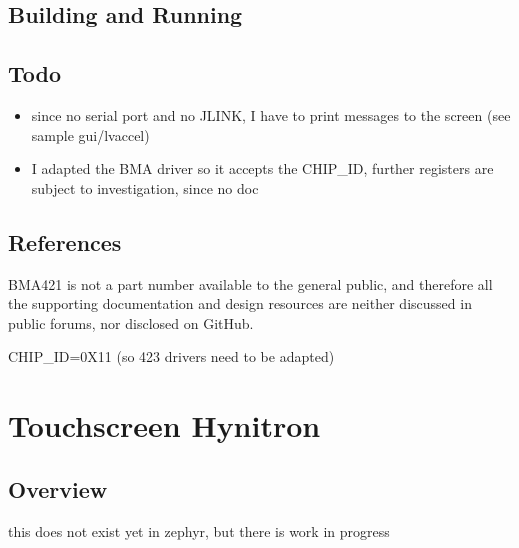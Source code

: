 \documentclass[letterpaper,10pt,english]{sphinxmanual}
\begin{document}
\subsection{Building and Running}
\label{\detokenize{behind/bma280:building-and-running}}

\subsection{Todo}
\label{\detokenize{behind/bma280:todo}}\begin{itemize}
\item {} 
since no serial port and no J\sphinxhyphen{}LINK, I have to print messages to the screen (see sample gui/lvaccel)

\item {} 
I adapted the BMA driver so it accepts the CHIP\_ID, further registers are subject to investigation, since no doc

\end{itemize}


\subsection{References}
\label{\detokenize{behind/bma280:references}}
BMA421 is not a part number available to the general public, and therefore all the supporting documentation and design resources are neither discussed in public forums, nor disclosed on GitHub.

CHIP\_ID=0X11  (so 423 drivers need to be adapted)


\section{Touchscreen Hynitron}
\label{\detokenize{behind/touchscreen:touchscreen-hynitron}}\label{\detokenize{behind/touchscreen::doc}}
\begin{sphinxVerbatim}[commandchars=\\\{\}]
\end{sphinxVerbatim}


\subsection{Overview}
\label{\detokenize{behind/touchscreen:overview}}
this does not exist yet in zephyr, but there is work in progress
\end{document}
